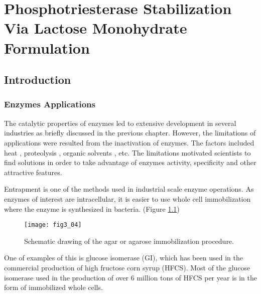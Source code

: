 \chapter{Phosphotriesterase Stabilization Via Lactose Monohydrate Formulation}
\label{chap:lactose}

\begin{refsection}

\section{Introduction}

\subsection{Enzymes Applications}

The catalytic properties of enzymes led to extensive development in several
industries as briefly discussed in the previous chapter. However, the
limitations of applications were resulted from the inactivation of enzymes. The
factors included heat \cite{Shirley1995}, proteolysis \cite{VandenBurg2002a},
organic solvents \cite{LeJeune1997a}, etc. The limitations motivated scientists
to find solutions in order to take advantage of enzymes activity, specificity
and other attractive features.

Entrapment is one of the methods used in industrial scale enzyme operations. As
enzymes of interest are intracellular, it is easier to use whole cell
immobilization where the enzyme is synthesized in bacteria. \cite{Trelles2013}
(Figure \ref{fig:enzyme-entrapment})
\begin{figure}[h!] \centering \texttt{[image: fig3\_04]}
    \caption[Schematic drawing of the agar or agarose immobilization
    procedure]{Schematic drawing of the agar or agarose immobilization
        procedure.\cite{Trelles2013}}
    \label{fig:enzyme-entrapment} 
\end{figure}

One of examples of this is glucose isomerase (GI), which has been used in the
commercial production of high fructose corn syrup (HFCS).\cite{Bhosale1996} Most of
the glucose isomerase used in the production of over 6 million tons of
HFCS per year is in the form of immobilized whole cells.



\end{refsection}
